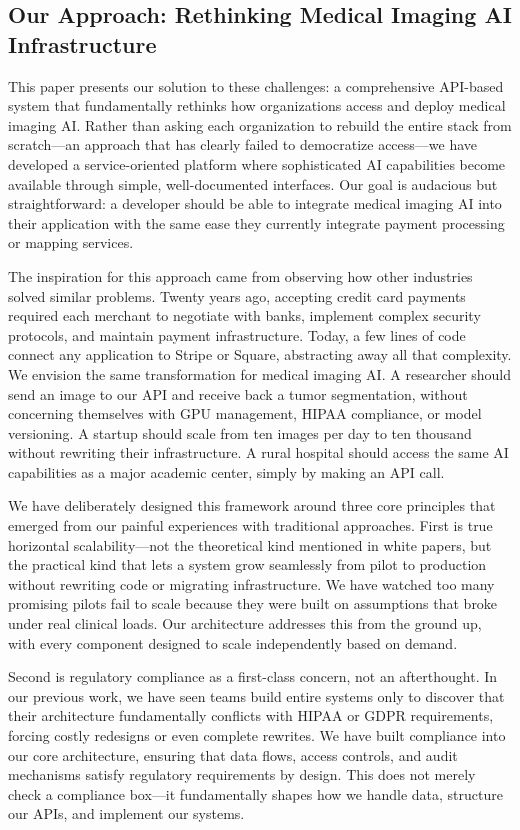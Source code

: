 \documentclass[12pt,a4paper]{article}
\begin{document}
\subsection{Our Approach: Rethinking Medical Imaging AI Infrastructure}

This paper presents our solution to these challenges: a comprehensive API-based system that fundamentally rethinks how organizations access and deploy medical imaging AI. Rather than asking each organization to rebuild the entire stack from scratch—an approach that has clearly failed to democratize access—we have developed a service-oriented platform where sophisticated AI capabilities become available through simple, well-documented interfaces. Our goal is audacious but straightforward: a developer should be able to integrate medical imaging AI into their application with the same ease they currently integrate payment processing or mapping services.

The inspiration for this approach came from observing how other industries solved similar problems. Twenty years ago, accepting credit card payments required each merchant to negotiate with banks, implement complex security protocols, and maintain payment infrastructure. Today, a few lines of code connect any application to Stripe or Square, abstracting away all that complexity. We envision the same transformation for medical imaging AI. A researcher should send an image to our API and receive back a tumor segmentation, without concerning themselves with GPU management, HIPAA compliance, or model versioning. A startup should scale from ten images per day to ten thousand without rewriting their infrastructure. A rural hospital should access the same AI capabilities as a major academic center, simply by making an API call.

We have deliberately designed this framework around three core principles that emerged from our painful experiences with traditional approaches. First is true horizontal scalability—not the theoretical kind mentioned in white papers, but the practical kind that lets a system grow seamlessly from pilot to production without rewriting code or migrating infrastructure. We have watched too many promising pilots fail to scale because they were built on assumptions that broke under real clinical loads. Our architecture addresses this from the ground up, with every component designed to scale independently based on demand.

Second is regulatory compliance as a first-class concern, not an afterthought. In our previous work, we have seen teams build entire systems only to discover that their architecture fundamentally conflicts with HIPAA or GDPR requirements, forcing costly redesigns or even complete rewrites. We have built compliance into our core architecture, ensuring that data flows, access controls, and audit mechanisms satisfy regulatory requirements by design. This does not merely check a compliance box—it fundamentally shapes how we handle data, structure our APIs, and implement our systems.
\end{document}
